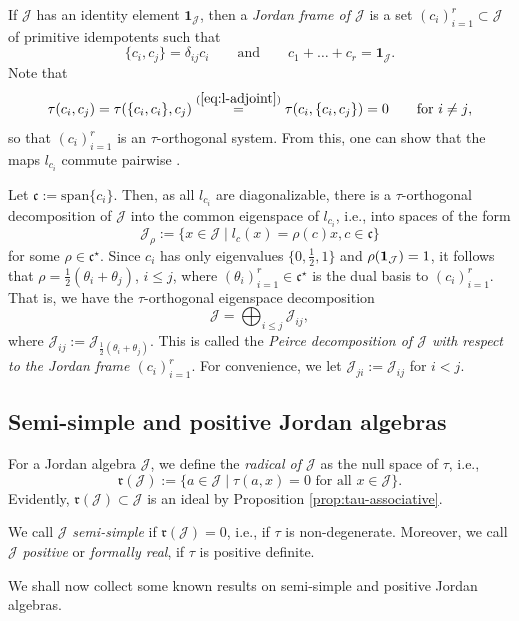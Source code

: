 \documentclass[pdftex]{sigma}
\numberwithin{equation}{section}
\newcommand{\be}{\begin{equation}}
\newcommand{\ee}{\end{equation}}
\newcommand{\Jcal}{\mathcal{J}}
\newcommand{\cf}{{\mathfrak c}}
\newcommand{\sspan}{{\mathrm{span}}}
\begin{document}
If $\Jcal$ has an identity element $\mathbf{1}_\Jcal$, then a {\em Jordan frame of $\Jcal$ }is a set $(c_i)_{i=1}^r \subset \Jcal$ of primitive idempotents such that
\be \label{eq:Jordan-frame}
\{c_i, c_j\} = \delta_{ij} c_i \qquad \text{and} \qquad c_1 + \dots + c_r = \mathbf{1}_\Jcal.
\ee
Note that
\[
\tau(c_i, c_j) = \tau(\{c_i, c_i\}, c_j) \stackrel{(\ref{eq:l-adjoint})}= \tau(c_i, \{c_i, c_j\}) = 0 \qquad \text{for $i \neq j$},
\]
so that $(c_i)_{i=1}^r$ is an $\tau$-orthogonal system. From this, one can show that the maps $l_{c_i}$ commute pairwise \cite[Lemma IV.1.3]{F-K-1994}.

Let $\cf := \sspan\{c_i\}$. Then, as all $l_{c_i}$ are diagonalizable, there is a $\tau$-orthogonal decomposition of $\Jcal$ into the common eigenspace of $l_{c_i}$, i.e., into spaces of the form
\[
\Jcal_\rho := \{ x \in \Jcal \mid l_{c}(x) = \rho(c) x, c \in \cf\}
\]
for some $\rho \in \cf^\star$. Since $c_i$ has only eigenvalues $\big\{0, \frac12, 1\big\}$ and $\rho({\bf 1}_\Jcal) = 1$, it follows that $\rho = \frac12(\theta_i + \theta_j)$, $i \leq j$, where $(\theta_i)_{i=1}^r \in \cf^\star$ is the dual basis to $(c_i)_{i=1}^r$. That is, we have the $\tau$-orthogonal eigenspace decomposition
\be \label{eq:Peirce}
\Jcal = \bigoplus_{i \leq j} \Jcal_{ij},
\ee
where $\Jcal_{ij} := \Jcal_{\frac12(\theta_i + \theta_j)}$. This is called the {\em Peirce decomposition of $\Jcal$ with respect to the Jordan frame $(c_i)_{i=1}^r$}. For convenience, we let $\Jcal_{ji} := \Jcal_{ij}$ for $i < j$.

\subsection{Semi-simple and positive Jordan algebras}

For a Jordan algebra $\Jcal$, we define the {\em radical of $\Jcal$ }as the null space of $\tau$, i.e.,
\[%
{\mathfrak r}(\Jcal) := \{ a \in \Jcal \mid \tau(a,x) = 0 \text{ for all $x \in \Jcal$}\}.
\]
Evidently, ${\mathfrak r}(\Jcal) \subset \Jcal$ is an ideal by Proposition \ref{prop:tau-associative}.

We call $\Jcal$ {\em semi-simple} if ${\mathfrak r}(\Jcal) = 0$, i.e., if $\tau$ is non-degenerate. Moreover, we call $\Jcal$ {\em positive }or {\em formally real}, if $\tau$ is positive definite.

We shall now collect some known results on semi-simple and positive Jordan algebras.
\end{document}
